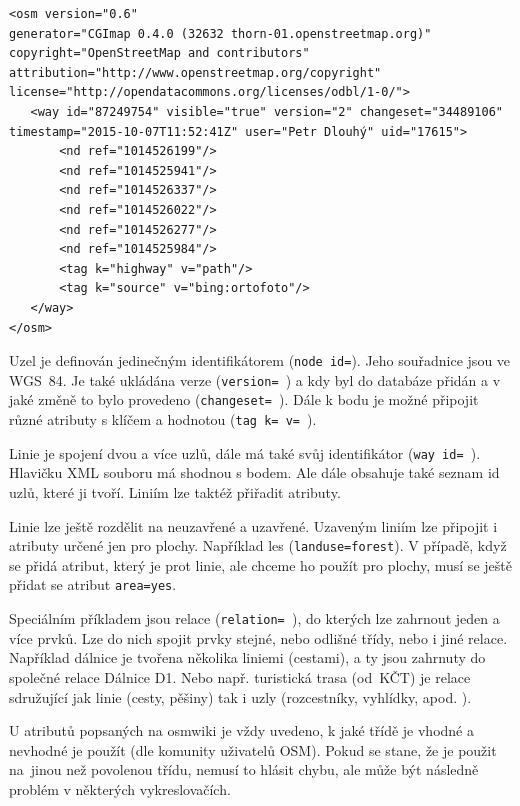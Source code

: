 {\scriptsize
\begin{lstlisting}
<osm version="0.6" 
generator="CGImap 0.4.0 (32632 thorn-01.openstreetmap.org)" copyright="OpenStreetMap and contributors" attribution="http://www.openstreetmap.org/copyright" license="http://opendatacommons.org/licenses/odbl/1-0/">
   <way id="87249754" visible="true" version="2" changeset="34489106" timestamp="2015-10-07T11:52:41Z" user="Petr Dlouhý" uid="17615">
       <nd ref="1014526199"/>
       <nd ref="1014525941"/>
       <nd ref="1014526337"/>
       <nd ref="1014526022"/>
       <nd ref="1014526277"/>
       <nd ref="1014525984"/>
       <tag k="highway" v="path"/>
       <tag k="source" v="bing:ortofoto"/>
   </way>
</osm>
\end{lstlisting}
}


Uzel je definován jedinečným identifikátorem ({\tt node id=}). Jeho
souřadnice jsou ve WGS~84. Je také ukládána verze ({\tt version= }) a kdy
byl do databáze přidán a v jaké změně to bylo provedeno ({\tt changeset=~}).
Dále k bodu je možné připojit různé atributy s klíčem a hodnotou ({\tt tag~k=~v=~}).

Linie je spojení dvou a více uzlů, dále má také svůj identifikátor ({\tt way~id=~}).
Hlavičku XML souboru má shodnou s bodem. Ale dále obsahuje také seznam id uzlů,
které ji tvoří. Liniím lze taktéž přiřadit atributy.

Linie lze ještě rozdělit na neuzavřené a uzavřené. Uzaveným liniím lze připojit
i atributy určené jen pro plochy. Například les ({\tt landuse=forest}).
V případě, když se přidá atribut, který je prot linie, ale chceme
ho použít pro plochy, musí se ještě přidat se atribut {\tt area=yes}.

Speciálním příkladem jsou relace ({\tt relation= }), do kterých lze zahrnout
jeden a více prvků. Lze do nich spojit prvky stejné, nebo odlišné třídy,
nebo i jiné relace. Například dálnice je tvořena několika liniemi (cestami), a ty
jsou zahrnuty do společné relace Dálnice D1. Nebo např. turistická trasa
(od~KČT) je relace sdružující jak linie (cesty, pěšiny) tak i uzly
(rozcestníky, vyhlídky, apod. ).

U atributů popsaných na osmwiki \cite{OSMfeatures} je vždy uvedeno, k jaké třídě je
vhodné a nevhodné je použít (dle komunity uživatelů OSM). Pokud se stane, že je použit
na~jinou než povolenou třídu, nemusí to hlásit chybu, ale může být následně
problém v některých vykreslovačích. 

